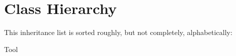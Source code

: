 \section{Class Hierarchy}
This inheritance list is sorted roughly, but not completely, alphabetically\-:\begin{DoxyCompactList}
\item {}
\item Tool\begin{DoxyCompactList}
\item {}
\item {}
\end{DoxyCompactList}
\end{DoxyCompactList}
